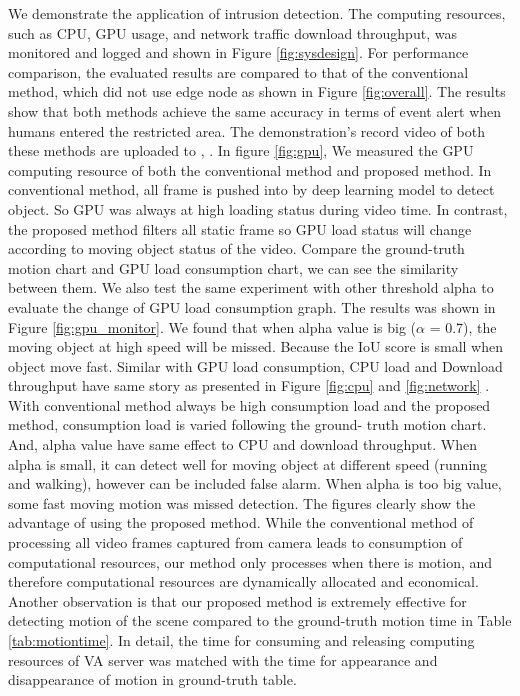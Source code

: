 We demonstrate the application of  intrusion detection. The computing resources, such as CPU, GPU usage, and network traffic download throughput, was monitored and logged and shown in Figure \ref{fig:sysdesign}. For performance comparison, the evaluated results are compared to that of the conventional method, which did not use edge node as shown in Figure \ref{fig:overall}. The results show that both methods achieve the same accuracy in terms of event alert when humans entered the restricted area. The demonstration's record video of both these methods are uploaded to \cite{convential}, \cite{proposed}. In figure \ref{fig:gpu}, We measured the GPU computing resource of both the conventional
method and proposed method. In conventional method, all frame is pushed into by deep learning model to detect object. So GPU was always at high loading status during video time. In contrast, the proposed method filters all static frame so GPU load status will change according to moving object status of the video. Compare the ground-truth motion chart and GPU load consumption chart, we can see the similarity between them.
We also test the same experiment with other threshold alpha to
evaluate the change of GPU load consumption graph. The results was shown in Figure \ref{fig:gpu_monitor}. We found that when alpha value is big ($\alpha$ = 0.7), the moving object at high speed
will be missed. Because the IoU score is small when object move fast. 
Similar with GPU load consumption, CPU load and Download
throughput have same story as presented in Figure \ref{fig:cpu} and \ref{fig:network} . With conventional method always be high consumption load and the proposed method, consumption load is varied following the ground-
truth motion chart. And, alpha value have same effect to CPU and download throughput. When alpha is small, it can detect well for moving object at different speed (running and walking), however can be included false alarm.
When alpha is too big value, some fast moving motion was missed detection.
The figures clearly show the advantage of using the proposed method. While the conventional method of processing all video frames captured from camera leads to consumption of computational resources, our method only processes when there is motion, and therefore computational resources are dynamically allocated and economical. Another observation is that our proposed method is extremely effective for detecting motion of the scene compared to the ground-truth motion time in Table \ref{tab:motiontime}. In detail,  the time for consuming and releasing computing resources of VA server was matched with the time for appearance and disappearance of motion in ground-truth table. \\
